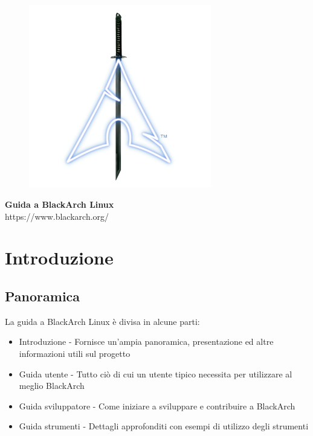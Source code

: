 \documentclass[a4paper, oneside, 11pt]{book}
\begin{document}
\pagestyle{empty}
\begin{center}
\begin{figure}[htbp]
\centering
\vspace{0.5cm}
\includegraphics[width=8cm]{images/logo.png}
\label{fig:logo}
\end{figure}
\vspace{0.5cm}
\Huge{\textbf{Guida a BlackArch Linux}}\\
\vspace{1cm}
\Large{\color{blue}https://www.blackarch.org/}\\
\vspace{0.5cm}
\end{center}
\newpage
\tableofcontents
\newpage
\pagestyle{fancy}


\chapter{Introduzione}

\section{Panoramica}
La guida a BlackArch Linux è divisa in alcune parti:
\begin{itemize}
\item Introduzione - Fornisce un'ampia panoramica, presentazione ed altre informazioni utili sul progetto
\item Guida utente - Tutto ciò di cui un utente tipico necessita per utilizzare al meglio BlackArch
\item Guida sviluppatore - Come iniziare a sviluppare e contribuire a BlackArch
\item Guida strumenti - Dettagli approfonditi con esempi di utilizzo degli strumenti
\end{itemize}
\end{document}
